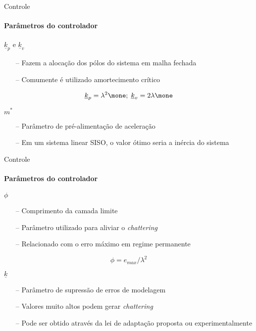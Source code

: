 \documentclass[25pt,landscape]{beamer}
\begin{document}
\begin{frame}{Controle}
    \framesubtitle{Par\^ametros do controlador}
    \pause
    \begin{block}{$\underline{k}_p$ e $\underline{k}_v$}
    	\begin{itemize}
    		\item[--] Fazem a aloca\c{c}\~ao dos p\'olos do sistema em malha fechada \\[6pt]
    		\item[--] Comumente \'e utilizado amortecimento cr\'itico \\[6pt]
    	\end{itemize}
    	$$ \underline{k}_p = \lambda^2 \mone; \; \underline{k}_v = 2\lambda \mone $$
    \end{block}
    \pause
    \begin{block}{$m^*$}
    	\begin{itemize}
    		\item[--] Par\^ametro de pr\'e-alimenta\c{c}\~ao de acelera\c{c}\~ao \\[6pt]
    		\item[--] Em um sistema linear SISO, o valor \'otimo seria a in\'ercia do sistema \\[6pt]
    	\end{itemize}
    \end{block}
\end{frame}

\begin{frame}{Controle}
    \framesubtitle{Par\^ametros do controlador}
    \begin{block}{$\phi$}
    	\begin{itemize}
    		\item[--] Comprimento da camada limite\\[6pt]
    		\item[--] Par\^ametro utilizado para aliviar o \emph{chattering} \\[6pt]
    		\item[--] Relacionado com o erro m\'aximo em regime permanente \\[6pt]
    	\end{itemize}
    	$$ \phi = e_{max}/ \lambda^2 $$
    \end{block}
     \pause
    \begin{block}{$\underline{k}$}
        \begin{itemize}
    		\item[--] Par\^ametro de supress\~ao de erros de modelagem \\[6pt]
    		\item[--] Valores muito altos podem gerar \emph{chattering} \\[6pt]
    		\item[--] Pode ser obtido atrav\'es da lei de adapta\c{c}\~ao proposta ou experimentalmente \\[6pt]
    	\end{itemize}
    \end{block}
\end{frame}
\end{document}
